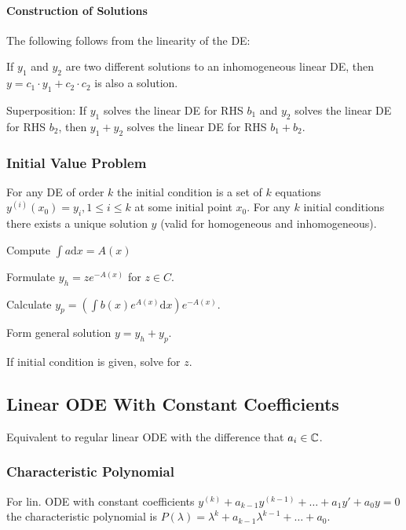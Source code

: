 \paragraph{Construction of Solutions}
The following follows from the linearity of the DE:
\begin{compactitem}
    \item If $y_1$ and $y_2$ are two different solutions to an inhomogeneous linear DE, then $y = c_1 \cdot y_1 + c_2 \cdot c_2$ is also a solution.
    \item Superposition: If $y_1$ solves the linear DE for RHS $b_1$ and $y_2$ solves the linear DE for RHS $b_2$, then $y_1 + y_2$ solves the linear DE for RHS $b_1 + b_2$.
\end{compactitem}

\subsubsection{Initial Value Problem}
For any DE of order $k$ the initial condition is a set of $k$ equations $y^{(i)} (x_0) = y_i, 1 \le i \le k$ at some initial point $x_0$.  For any $k$ initial conditions there exists a unique solution $y$ (valid for homogeneous and inhomogeneous).

\begin{compactenum}
    \item Compute $\int a \mathrm{d}x = A(x)$
    \item Formulate $y_h = z e^{-A(x)}$ for $z \in C$.
    \item Calculate $y_p = (\int b(x) e^{A(x)} \mathrm{d}x) e^{-A(x)}$.
    \item Form general solution $y = y_h + y_p$.
    \item If initial condition is given, solve for $z$.
\end{compactenum}

\subsection{Linear ODE With Constant Coefficients}
Equivalent to regular linear ODE with the difference that $a_i \in \mathbb{C}$.

\subsubsection{Characteristic Polynomial}
For lin. ODE with constant coefficients $y^{(k)} + a_{k - 1}y^{(k - 1)} + \dots + a_1y' + a_0y = 0$ the characteristic polynomial is $P(\lambda) = \lambda^k + a_{k - 1} \lambda^{k - 1} + \dots + a_0$.

